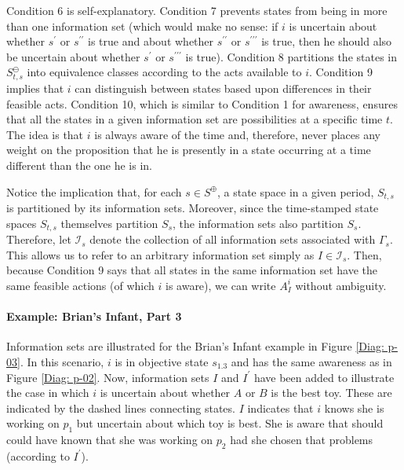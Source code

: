 \documentclass[
11pt,
titlepage,
reqno,
]{article}%
\theoremstyle{definition}
\begin{document}
Condition 6 is self-explanatory. 
Condition 7 prevents states from being in more than one information set (which would make no sense: if $i$ is uncertain about whether $s^{\prime}$ or $s^{\prime\prime}$ is true and about whether $s^{\prime\prime}$ or $s^{\prime\prime\prime}$ is true, then he should also be uncertain about whether $s^{\prime}$ or $s^{\prime\prime\prime}$ is true).
Condition 8  partitions the states in $S^\ominus_{t,s}$ into equivalence classes according to the acts available to $i$.
Condition 9 implies that $i$ can distinguish between states based upon differences in their feasible acts.
Condition 10, which is similar to Condition 1 for awareness, ensures that all the states in a given information set are possibilities at a specific time $t$.
The idea is that $i$ is always aware of the time and, therefore, never places any weight on the proposition that he is presently in a state occurring at a time different than the one he is in. 


Notice the implication that, for each $s\in S^\oplus$, a state space in a given period, $S_{t,s}$ is partitioned by its information sets.
Moreover, since the time-stamped state spaces $S_{t,s}$ themselves partition $S_s$, the information sets also partition $S_s$.
Therefore, let $\mathcal{I}_s$ denote the collection of all information sets associated with $\Gamma_s$.
This allows us to refer to an arbitrary information set simply as $I\in\mathcal{I}_s$.
Then, because Condition 9 says that all states in the same information set have the same feasible actions (of which $i$ is aware), we can write $A^i_I$ without ambiguity.
	
\paragraph{Example: Brian's Infant, Part 3}	Information sets are illustrated for the Brian's Infant example in Figure \ref{Diag: p-03}. 
In this scenario, $i$ is in objective state $s_{1.3}$ and has the same awareness as in Figure \ref{Diag: p-02}. 
Now, information sets $I$ and $I^\prime$ have been added to illustrate the case in which $i$ is uncertain about whether $A$ or $B$ is the best toy.
These are indicated by the dashed lines connecting states. 
$I$ indicates that $i$ knows she is working on $p_1$ but uncertain about which toy is best.
She is aware that should could have known that she was working on $p_2$ had she chosen that problems (according to $I^\prime$).
	
\end{document}
